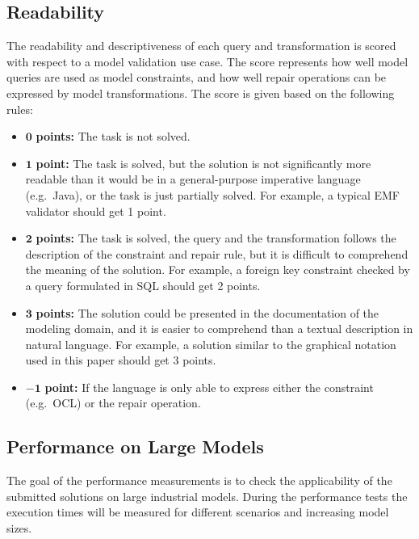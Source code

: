 \documentclass[submission,copyright,creativecommons]{eptcs}
\begin{document}
\noindent{}

\subsection{Readability}

The readability and descriptiveness of each query and transformation is scored with respect to a model validation use case. The score represents how well model queries are used as model constraints, and how well repair operations can be expressed by model transformations. The score is given based on the following rules:
\begin{itemize}
  \item $\mathbf{0}$   \textbf{points:} The task is not solved.
  \item $\mathbf{1}$   \textbf{point:} The task is solved, but the solution is not significantly more readable than it would be in a general-purpose imperative language (e.g.\ Java), or the task is just partially solved. For example, a typical EMF validator should get 1 point.
  \item $\mathbf{2}$   \textbf{points:} The task is solved, the query and the transformation follows the description of the constraint and repair rule, but it is difficult to comprehend the meaning of the solution. For example, a foreign key constraint checked by a query formulated in SQL should get 2 points.
  \item $\mathbf{3}$   \textbf{points:} The solution could be presented in the documentation of the modeling domain, and it is easier to comprehend than a textual description in natural language. For example, a solution similar to the graphical notation used in this paper should get 3 points.
  \item $\mathbf{-1}$  \textbf{point:} If the language is only able to express either the constraint (e.g.\ OCL) or the repair operation.
\end{itemize}

\noindent{}

\subsection{Performance on Large Models}
The goal of the performance measurements is to check the applicability of the submitted solutions on large industrial models. During the performance tests the execution times will be measured for different scenarios and increasing model sizes.
\end{document}
